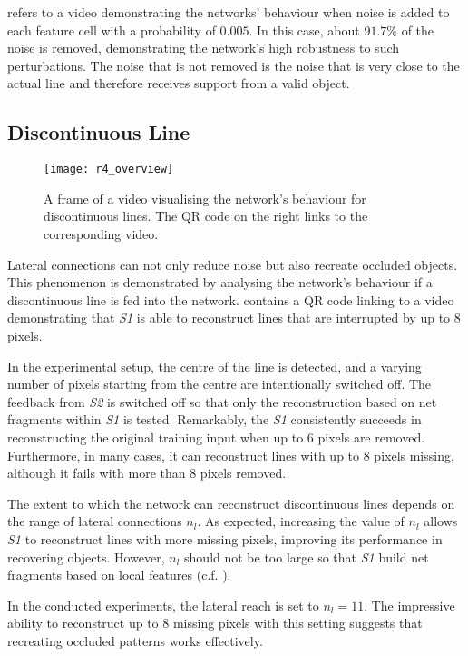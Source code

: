 refers to a video demonstrating the networks' behaviour when noise is added to each feature cell with a probability of $0.005$.
In this case, about $91.7\%$ of the noise is removed, demonstrating the network's high robustness to such perturbations.
The noise that is not removed is the noise that is very close to the actual line and therefore receives support from a valid object.

\subsection{Discontinuous Line}
%
\begin{figure}[h]
    \centering
    \texttt{[image: r4\_overview]}
    \caption[Video visualising the network's behaviour for discontinuous lines]{A frame of a video visualising the network's behaviour for discontinuous lines. The QR code on the right links to the corresponding video.}
\end{figure}
%
Lateral connections can not only reduce noise but also recreate occluded objects.
This phenomenon is demonstrated by analysing the network's behaviour if a discontinuous line is fed into the network.
 contains a QR code linking to a video demonstrating that \emph{S1} is able to reconstruct lines that are interrupted by up to $8$ pixels.

In the experimental setup, the centre of the line is detected, and a varying number of pixels starting from the centre are intentionally switched off.
The feedback from \emph{S2} is switched off so that only the reconstruction based on net fragments within \emph{S1} is tested.
Remarkably, the \emph{S1} consistently succeeds in reconstructing the original training input when up to $6$ pixels are removed. Furthermore, in many cases, it can reconstruct lines with up to $8$ pixels missing, although it fails with more than $8$ pixels removed.

The extent to which the network can reconstruct discontinuous lines depends on the range of lateral connections $n_l$. As expected, increasing the value of $n_l$ allows \emph{S1} to reconstruct lines with more missing pixels, improving its performance in recovering objects.
However, $n_l$ should not be too large so that \emph{S1} build net fragments based on local features (c.f. ).

In the conducted experiments, the lateral reach is set to $n_l=11$.
The impressive ability to reconstruct up to $8$ missing pixels with this setting suggests that recreating occluded patterns works effectively.


